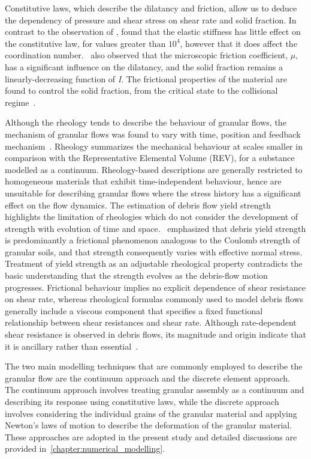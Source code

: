Constitutive laws, which describe the dilatancy and friction, allow us to 
deduce the dependency of pressure and shear stress on shear rate and solid 
fraction. In contrast to the observation of \citet{Campbell2002}, 
\citet{DaCruz2005} found that the elastic stiffness has little effect on the 
constitutive law, for values greater than $10^{4}$, however that it does affect 
the coordination number.~\citet{DaCruz2005} also observed that the microscopic 
friction coefficient, $\mu$, has a significant influence on the dilatancy, and 
the solid fraction remains a linearly-decreasing function of \textit{I}. The 
frictional properties of the material are found to control the solid fraction, 
from the critical state to the collisional regime~\citep{DaCruz2005}. 

Although the rheology tends to describe the behaviour of granular flows, the 
mechanism of granular flows was found to vary with time, position and feedback 
mechanism~\citep{Iverson2003}. Rheology summarizes the mechanical behaviour at 
scales smaller in comparison with the Representative Elemental Volume (REV), 
for a substance modelled as a continuum. Rheology-based descriptions are 
generally restricted to homogeneous materials that exhibit time-independent 
behaviour, hence are unsuitable for describing granular flows where the stress 
history has a significant effect on the flow dynamics. The estimation of debris 
flow yield strength highlights the limitation of rheologies which do not 
consider the development of strength with evolution of time and 
space.~\citet{Johnson1965} emphasized that debris yield strength is 
predominantly a frictional phenomenon analogous to the Coulomb strength of 
granular soils, and that strength consequently varies with effective normal 
stress. Treatment of yield strength as an adjustable rheological property 
contradicts the basic understanding that the strength evolves as the 
debris-flow motion progresses. Frictional behaviour implies no explicit 
dependence of shear resistance on shear rate, whereas rheological formulas 
commonly used to model debris flows generally include a viscous component that 
specifies a fixed functional relationship between shear resistances and shear 
rate. Although rate-dependent shear resistance is observed in debris flows, its 
magnitude and origin indicate that it is ancillary rather than 
essential~\citep{Iverson2003}.

The two main modelling techniques that are commonly employed to describe the 
granular flow are the continuum approach and the discrete element approach. The 
continuum approach involves treating granular assembly as a continuum and 
describing its response using constitutive laws, while the discrete approach 
involves considering the individual grains of the granular material and 
applying Newton's laws of motion to describe the deformation of the granular 
material. These approaches are adopted in the present study and detailed 
discussions are provided in~\cref{chapter:numerical_modelling}. 

